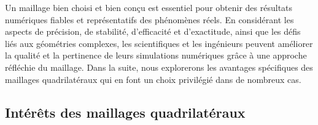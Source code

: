 Un maillage bien choisi et bien conçu est essentiel pour obtenir des résultats numériques fiables et représentatifs des phénomènes réels. En considérant les aspects de précision, de stabilité, d'efficacité et d'exactitude, ainsi que les défis liés aux géométries complexes, les scientifiques et les ingénieurs peuvent améliorer la qualité et la pertinence de leurs simulations numériques grâce à une approche réfléchie du maillage. Dans la suite, nous explorerons les avantages spécifiques des maillages quadrilatéraux qui en font un choix privilégié dans de nombreux cas.

\subsection{Intérêts des maillages quadrilatéraux}

